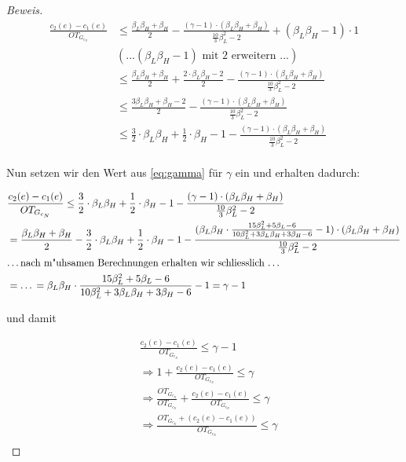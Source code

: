 \documentclass[a4paper,11pt]{scrreprt}
\begin{document}
\begin{proof}[Beweis]
\begin{align*}
\frac{c_2(e) - c_1(e)}{OT_{G_{c_N}}} &\le \frac{\beta_L\beta_H + \beta_H}{2} - \frac{(\gamma - 1)\cdot(\beta_L\beta_H + \beta_H)}{\frac{10}{3}\beta_L^2 - 2} + (\beta_L\beta_H - 1) \cdot 1\\
&(\text{...} (\beta_L\beta_H - 1)\text{ mit 2 erweitern ...})\\
&\le \frac{\beta_L\beta_H + \beta_H}{2} + \frac{2\cdot \beta_L\beta_H - 2}{2} - \frac{(\gamma - 1)\cdot(\beta_L\beta_H + \beta_H)}{\frac{10}{3}\beta_L^2 - 2}\\
&\le \frac{3\beta_L\beta_H + \beta_H - 2}{2} - \frac{(\gamma - 1)\cdot(\beta_L\beta_H + \beta_H)}{\frac{10}{3}\beta_L^2 - 2}\\
&\le \frac{3}{2}\cdot\beta_L\beta_H + \frac{1}{2}\cdot\beta_H - 1 - \frac{(\gamma - 1)\cdot(\beta_L\beta_H + \beta_H)}{\frac{10}{3}\beta_L^2 - 2}\\
\end{align*}

Nun setzen wir den Wert aus \ref{eq:gamma} für $\gamma$ ein und erhalten dadurch:

\begin{align*}
&\frac{c_2(e) - c_1(e)}{OT_{G_{c_N}}} \le \frac{3}{2}\cdot\beta_L\beta_H + \frac{1}{2}\cdot\beta_H - 1 - \frac{(\gamma - 1)\cdot(\beta_L\beta_H + \beta_H)}{\frac{10}{3}\beta_L^2 - 2}\\
&= \frac{\beta_L\beta_H + \beta_H}{2} -  \frac{3}{2}\cdot\beta_L\beta_H + \frac{1}{2}\cdot\beta_H - 1 - \frac{(\beta_L\beta_H \cdot \frac{15\beta_L^2 + 5\beta_L - 6}{10\beta_L^2 + 3\beta_L\beta_H + 3\beta_H -6} - 1)\cdot(\beta_L\beta_H + \beta_H)}{\frac{10}{3}\beta_L^2 - 2}\\
&\text{\dots nach m"uhsamen Berechnungen erhalten wir schliesslich \dots}\\
&= \text{\dots} = \beta_L\beta_H \cdot \frac{15\beta_L^2 + 5\beta_L - 6}{10\beta_L^2 + 3\beta_L\beta_H + 3\beta_H -6} - 1 = \gamma - 1
\end{align*}

und damit 


\begin{align*}
&\frac{c_2(e) - c_1(e)}{OT_{G_{c_N}}} \le \gamma - 1\\
&\Rightarrow 1 + \frac{c_2(e) - c_1(e)}{OT_{G_{c_N}}} \le \gamma\\
&\Rightarrow \frac{OT_{G_{c_N}}}{OT_{G_{c_N}}} + \frac{c_2(e) - c_1(e)}{OT_{G_{c_N}}} \le \gamma\\
&\Rightarrow \frac{OT_{G_{c_N}} + (c_2(e) - c_1(e))}{OT_{G_{c_N}}} \le \gamma\\
\end{align*}


\end{proof}
\end{document}
